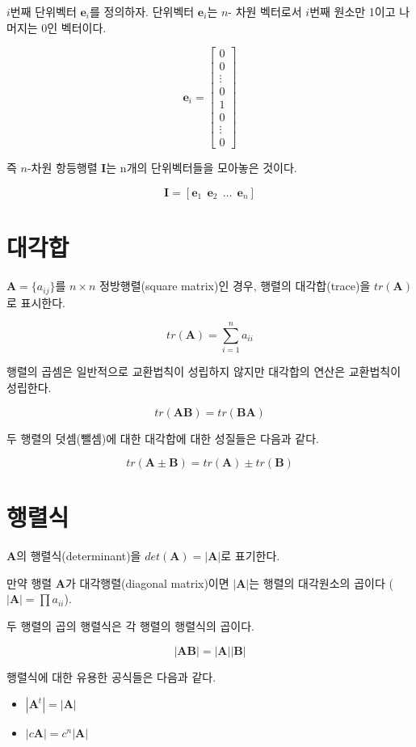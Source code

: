 \documentclass[
  11pt,
  a4paper,
  oneside]{scrbook}
\providecommand{\tightlist}{%
  \setlength{\itemsep}{0pt}\setlength{\parskip}{0pt}}\usepackage{longtable,booktabs,array}
\theoremstyle{definition}
\theoremstyle{plain}
\theoremstyle{definition}
\theoremstyle{definition}
\theoremstyle{remark}
\begin{document}
\(i\)번째 단위벡터 \(\pmb e_i\)를 정의하자. 단위벡터 \(\pmb e_i\)는
\(n\)- 차원 벡터로서 \(i\)번째 원소만 1이고 나머지는 0인 벡터이다.

\[ \pmb e_i = 
\begin{bmatrix}
0 \\
0 \\
\vdots \\ 
0 \\  
1 \\
0 \\
\vdots \\
0 
\end{bmatrix}
\]

즉 \(n\)-차원 항등행렬 \(\pmb I\)는 n개의 단위벡터들을 모아놓은 것이다.

\[  \pmb I = [ \pmb e_1 ~~ \pmb e_2 ~~ \dots ~~ \pmb e_n ] \]

\section{대각합}\label{uxb300uxac01uxd569}

\(\pmb A = \{ a_{ij} \}\)를 \(n \times n\) 정방행렬(square matrix)인
경우, 행렬의 대각합(trace)을 \(tr(\pmb A)\)로 표시한다.

\[ tr(\pmb A) = \sum_{i=1}^n a_{ii} \]

행렬의 곱셈은 일반적으로 교환법칙이 성립하지 않지만 대각합의 연산은
교환법칙이 성립한다.

\[  tr(\pmb A \pmb B)  = tr( \pmb B \pmb A) \]

두 행렬의 덧셈(뺄셈)에 대한 대각합에 대한 성질들은 다음과 같다.

\[ tr( {\pmb A} \pm {\pmb B}) = tr({\pmb A}) \pm tr({\pmb B}) \]

\section{행렬식}\label{uxd589uxb82cuxc2dd}

\(\pmb A\)의 행렬식(determinant)을 \(det(\pmb A)=|\pmb A|\)로 표기한다.

만약 행렬 \(\pmb A\)가 대각행렬(diagonal matrix)이면 \(|\pmb A|\)는
행렬의 대각원소의 곱이다 (\(| \pmb A| =\prod a_{ii}\)).

두 행렬의 곱의 행렬식은 각 행렬의 행렬식의 곱이다.

\[ |\pmb A \pmb B | = | \pmb A| |\pmb B| \]

행렬식에 대한 유용한 공식들은 다음과 같다.

\begin{itemize}
\tightlist
\item
  \(|{\pmb A}^t| = |{\pmb A}|\)
\item
  \(|c {\pmb A}| = c^n |{\pmb A}|\)
\end{itemize}
\end{document}
